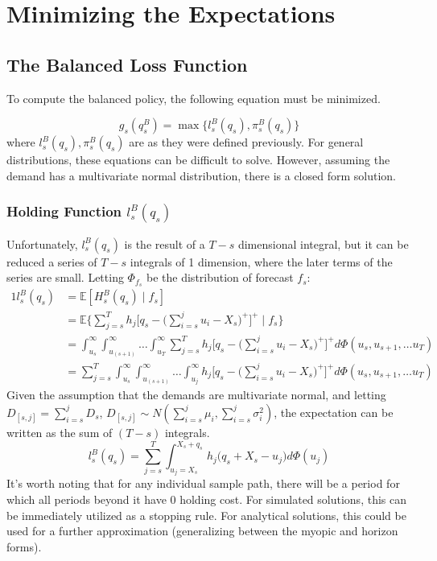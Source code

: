 \documentclass[12pt]{report}
\newcommand{\EX}{\mathbb{E}}
\begin{document}
\section*{Minimizing the Expectations}

\subsection*{The Balanced Loss Function}

To compute the balanced policy, the following equation must be minimized.

$$
	g_s(q_s^B) = \max\{l_s^B(q_s), \pi_s^B(q_s)\}
$$
where $l_s^B(q_s), \pi_s^B(q_s)$ are as they were defined previously. For general distributions, these equations can be difficult to solve. However, assuming the demand has a multivariate normal distribution, there is a closed form solution.  

\subsubsection*{Holding Function $l_s^B(q_s)$}

Unfortunately, $l_s^B(q_s)$ is the result of a $T - s$ dimensional integral, but it can be reduced a series of $T-s$ integrals of 1 dimension, where the later terms of the series are small. Letting $\Phi_{f_s}$ be the distribution of forecast $f_s$: 
\begin{alignat*}{1}
	l_s^B(q_s) &= \EX [H_s^B(q_s) \; | \; f_s] \\
        &= \EX \bigg\{\sum_{j=s}^T h_j\bigg[q_s - \bigg(\sum_{i=s}^j u_i - X_s\bigg)^+\bigg]^+  \; | \; f_s \bigg\} \\
		&= \int_{u_s}^{\infty} \int_{u_{(s+1)}}^{\infty}\dots \int_{u_T}^{\infty}\sum_{j=s}^T h_j\bigg[q_s - \bigg(\sum_{i=s}^j u_i - X_s\bigg)^+\bigg]^+ d\Phi(u_s, u_{s+1}, \dots u_T)\\
	   &= \sum_{j=s}^T \int_{u_s}^{\infty} \int_{u_{(s+1)}}^{\infty}\dots \int_{u_j}^{\infty} h_j\bigg[q_s - \bigg(\sum_{i=s}^j u_i - X_s\bigg)^+\bigg]^+ d\Phi(u_s, u_{s+1}, \dots u_T)
\end{alignat*}
Given the assumption that the demands are multivariate normal, and letting $D_{[s, j]} = \sum_{i=s}^j D_s$, $D_{[s, j]} \sim N(\sum_{i=s}^j \mu_i, \sum_{i=s}^j \sigma_i^2)$, the expectation can be written as the sum of $(T - s)$ integrals. 
\begin{equation}
	l_s^B(q_s) = \sum_{j=s}^T \int_{u_j=X_s}^{X_s + q_s} h_j\bigg(q_s + X_s - u_j \bigg) d\Phi(u_j)
\end{equation}
It's worth noting that for any individual sample path, there will be a period for which all periods beyond it have 0 holding cost. For simulated solutions, this can be immediately utilized as a stopping rule. For analytical solutions, this could be used for a further approximation (generalizing between the myopic and horizon forms). 
\end{document}

